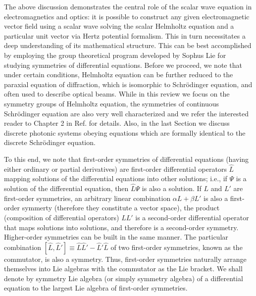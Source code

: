 \documentclass[12pt]{iopart}
\begin{document}
The above discussion demonstrates the central role of the scalar wave equation in electromagnetics and optics:
it is possible to construct any given electromagnetic vector field using a scalar wave solving the scalar Helmholtz
equation and a particular unit vector via Hertz potential formalism. This in turn necessitates a deep understanding of its mathematical structure. This can be best accomplished by employing the group theoretical program developed by Sophus Lie \cite{Lie1880p441} for studying symmetries of differential equations.
Before we proceed, we note that under certain conditions, Helmholtz equation can be further reduced to the paraxial equation of diffraction, which is isomorphic to Schr\"odinger equation, and often used to describe optical beams. While in this review we focus on the symmetry groups of Helmholtz equation, the symmetries of continuous Schr\"odinger equation are also very well characterized and we refer the interested reader to Chapter 2 in Ref. \cite{Miller1984} for details. Also, in the last Section we discuss discrete photonic systems obeying equations which are formally identical to the discrete Schr\"odinger equation.

To this end, we note that first-order symmetries of differential equations (having either ordinary or partial derivatives) are first-order differential operators $\hat{L}$ mapping solutions of the differential equations into other solutions; i.e., if $\Psi$ is a solution of the differential equation, then $\hat{L}\Psi$ is
also a solution.
If $L$ and $L'$ are first-order symmetries, an arbitrary linear combination $\alpha L + \beta L'$  is also a
first-order symmerty (therefore they constitute a vector space), the product (composition of differential operators) $LL'$ is a second-order
differential operator that maps solutions into solutions, and therefore is a second-order symmetry. Higher-order symmetries can be built in the same manner.
The particular combination $[\hat{L},\hat{L}']\equiv \hat{L}\hat{L}'-\hat{L}'\hat{L}$ of two first-order symmetries, known as the
commutator, is also a symmetry.
Thus, first-order symmetries naturally arrange themselves into Lie algebras with the commutator as the Lie bracket. We shall denote by
symmetry Lie algebra (or simply symmetry algebra) of a differential equation  to the largest Lie algebra of first-order symmetries.
\end{document}

